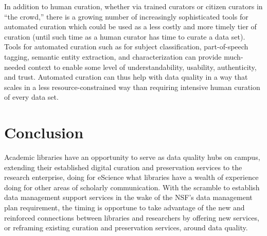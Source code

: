 \documentclass[12pt,letterpaper,titlepage,onecolumn,biblatex,backend=biber,style=chicago-authordate]{article}
\begin{document}
In addition to human curation, whether via trained curators or citizen
curators in ``the crowd,'' there is a growing number of increasingly
sophisticated tools for automated curation which could be used as a
less costly and more timely tier of curation (until such time as a
human curator has time to curate a data set). Tools for automated
curation such as for subject classification, part-of-speech tagging,
semantic entity extraction, and characterization can provide
much-needed context to enable some level of understandability,
usability, authenticity, and trust. Automated curation can thus help
with data quality in a way that scales in a less resource-constrained
way than requiring intensive human curation of every data set.

\section{Conclusion}

Academic libraries have an opportunity to serve as data quality hubs
on campus, extending their established digital curation and
preservation services to the research enterprise, doing for eScience
what libraries have a wealth of experience doing for other areas of
scholarly communication. With the scramble to establish data
management support services in the wake of the NSF's data management
plan requirement, the timing is opportune to take advantage of the new
and reinforced connections between libraries and researchers by
offering new services, or reframing existing curation and preservation
services, around data quality.

%
\end{document}
